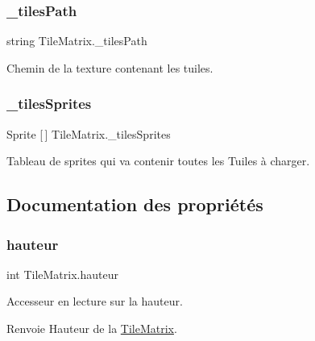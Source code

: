 \subsubsection{\texorpdfstring{\+\_\+tiles\+Path}{\_tilesPath}}
{\footnotesize\ttfamily string Tile\+Matrix.\+\_\+tiles\+Path\hspace{0.3cm}{\ttfamily [protected]}}



Chemin de la texture contenant les tuiles.

\mbox{\label{class_tile_matrix_a4ce60be6cdb0aa0133b65e1661677583}} 
\subsubsection{\texorpdfstring{\+\_\+tiles\+Sprites}{\_tilesSprites}}
{\footnotesize\ttfamily Sprite \mbox{[}$\,$\mbox{]} Tile\+Matrix.\+\_\+tiles\+Sprites\hspace{0.3cm}{\ttfamily [protected]}}



Tableau de sprites qui va contenir toutes les Tuiles à charger.



\subsection{Documentation des propriétés}
\mbox{\label{class_tile_matrix_a03b3e21bbee70f916ba6075150d8570b}} 
\subsubsection{\texorpdfstring{hauteur}{hauteur}}
{\footnotesize\ttfamily int Tile\+Matrix.\+hauteur\hspace{0.3cm}{\ttfamily [get]}}



Accesseur en lecture sur la hauteur. 

\begin{DoxyReturn}{Renvoie}
Hauteur de la \hyperlink{class_tile_matrix}{Tile\+Matrix}. 
\end{DoxyReturn}
\mbox{\label{class_tile_matrix_adbffb02d3f0eba910ccbe6054a776105}} 
